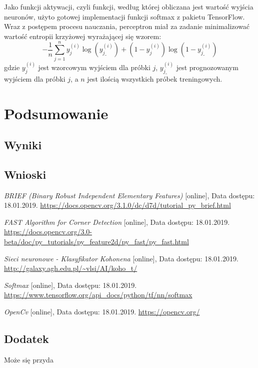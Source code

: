 \documentclass[12pt, notitlepage]{article}
\begin{document}
Jako funkcji aktywacji, czyli funkcji, według której obliczana jest wartość wyjścia neuronów, użyto gotowej implementacji funkcji softmax\cite{softmax} z pakietu TensorFlow. Wraz z postępem procesu nauczania, perceptron miał za zadanie minimalizować wartość entropii krzyżowej wyrażającej się wzorem: $$-\frac{1}{n}\sum_{j=1}^{n}y_j^{(i)}\log(y_{j\_}^{(i)}) + (1  - y_j^{(i)})\log(1 - y_{j\_}^{(i)})$$
gdzie $y_j^{(i)}$ jest wzorcowym wyjściem dla próbki $j$, $y_{j\_}^{(i)}$ jest prognozowanym wyjściem dla próbki $j$, a $n$ jest ilością wszystkich próbek treningowych.

\section{Podsumowanie}

\subsection{Wyniki}

\subsection{Wnioski}

\newpage

\begin{thebibliography}{9}

\textit{BRIEF (Binary Robust Independent Elementary Features) } [online], Data dostępu: 18.01.2019. 
\newline\url{https://docs.opencv.org/3.1.0/dc/d7d/tutorial_py_brief.html}

\textit{FAST Algorithm for Corner Detection} [online], Data dostępu: 18.01.2019. 
\newline\url{https://docs.opencv.org/3.0-beta/doc/py_tutorials/py_feature2d/py_fast/py_fast.html}

\textit{Sieci neuronowe - Klasyfikator Kohonena} [online], Data dostępu: 18.01.2019. 
\newline\url{http://galaxy.agh.edu.pl/~vlsi/AI/koho_t/}

\textit{Softmax} [online], Data dostępu: 18.01.2019. 
\newline\url{https://www.tensorflow.org/api_docs/python/tf/nn/softmax}

\textit{OpenCv} [online], Data dostępu: 18.01.2019. 
\newline\url{https://opencv.org/}

\end{thebibliography} 


\newpage
\setlength\parindent{24pt}
\begin{appendices}

\section{Dodatek}

Może się przyda

\end{appendices}
\end{document}
